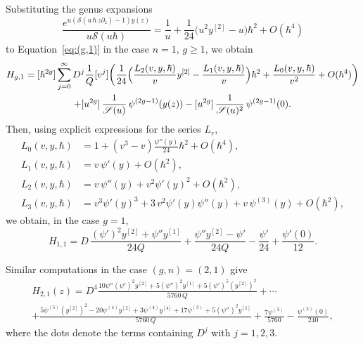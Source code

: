 \documentclass[JEP,XML,SOM,Unicode,NoEqCountersInSection,NoFloatCountersInSection]{cedram}
\let\mathcal\mathscr
\theoremstyle{plain}
\theoremstyle{definition}
\theoremstyle{remark}
\newcommand{\cS}{\mathcal{S}}
\begin{document}
Substituting the genus expansions
\begin{equation}\label{eq:V-exp}
\frac{e^{u(\cS(u\,\hbar\, z\partial_{z})-1)y(z)}}{u\cS(u\hbar)}
=\frac{1}{u}+\frac{1}{24} \bigl(u^2 y^{[2]}-u \bigr)\hbar ^2 +O(\hbar^4)
\end{equation}
to Equation~\eqref{eq:(g,1)} in the case $n=1$, $g\ge1$, we obtain
\begin{multline*}
H_{g,1} =[\hbar^{2g}]\sum_{j=0}^\infty D^j \frac{1}{Q}[v^j]
\biggl(\frac1{24} \Bigl(\frac{L_2(v,y,\hbar)}{v}y^{[2]}-\frac{L_1(v,y,\hbar)}{v} \Bigr)\hbar^2
+\frac{L_0(v,y,\hbar)}{v^2}+O(\hbar^4) \biggr)
\\
+[u^{2g}]\,\frac1{\cS(u)}\, \psi^{(2g-1)}(y(z))
-[u^{2g}]\,\frac1{\cS(u)^2}\, \psi^{(2g-1)}(0).
\end{multline*}
Then, using explicit expressions for the series $L_r$,
\begin{equation}\label{eq:L-exp}
\begin{aligned}
L_0(v,y,\hbar)&=1+(v^3- v)\frac{\psi ''(y)}{24} \hbar ^2+O(\hbar^4),\\
L_1(v,y,\hbar)&=v\,\psi'(y)+O(\hbar^2),\\
L_2(v,y,\hbar)&=v\,\psi ''(y)+v^2 \psi '(y)^2+O(\hbar^2),\\
L_3(v,y,\hbar)&=v^3 \psi '(y)^3+3\,v^2 \psi '(y) \psi ''(y)+v\,\psi ^{(3)}(y)+O(\hbar^2),
\end{aligned}
\end{equation}
we obtain, in the case $g=1$,
\begin{equation*}
H_{1,1}
=D\,\frac{\left(\psi'\right)^2 y^{[2]}+\psi''y^{[1]}}{24Q}+
\frac{\psi'' y^{[2]}-\psi'}{24Q}-\frac{\psi'}{24}+\frac{\psi'(0)}{12}.
\end{equation*}

Similar computations in the case $(g,n)=(2,1)$ give
\begin{multline*}
H_{2,1}(z) =D^4\frac{10 \psi'' \left(\psi'\right)^2 y^{[2]}+5 \left(\psi''\right)^2 y^{[1]}+5 \left(\psi'\right)^5 \left(y^{[2]}\right)^2}{5760\,Q}
+\cdots\\
+\frac{5 \psi^{(5)} \left(y^{[2]}\right)^2-20 \psi^{(4)} y^{[2]}+3 \psi^{(4)} y^{[4]}+17 \psi^{(3)}+5 \left(\psi''\right)^2 y^{[1]}}{5760\,Q}
+\frac{7\psi^{(3)}}{5760}-\frac{\psi ^{(3)}(0)}{240},
\end{multline*}
where the dots denote the terms containing $D^j$ with $j=1,2,3$.
\end{document}
